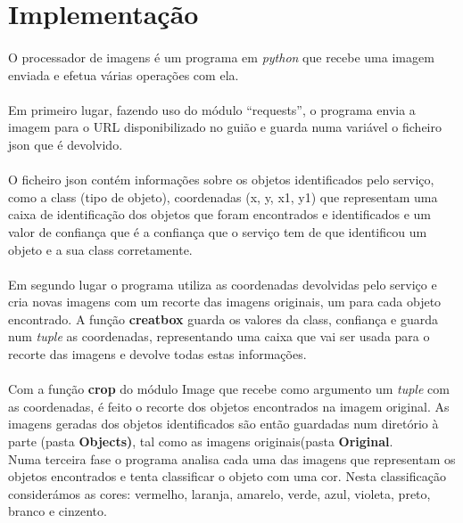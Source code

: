 \documentclass{report}
\begin{document}
\section{Implementação}
\paragraph{}
O processador de imagens é um programa em \textit{python} que recebe uma imagem enviada e
efetua várias operações com ela. 

\paragraph{}

Em primeiro lugar, fazendo uso do módulo “requests”, o programa envia a imagem para o URL
disponibilizado no guião\cite{Object_Detection} e guarda numa variável o ficheiro json que é devolvido. 
\paragraph{}
O ficheiro json contém informações sobre os objetos identificados pelo serviço, como a
class (tipo de objeto), coordenadas (x, y, x1, y1) que representam uma caixa de identificação dos objetos
que foram encontrados e identificados e um valor de confiança que é a confiança que o serviço
tem de que identificou um objeto e a sua class corretamente. 
\paragraph{}
Em segundo lugar o programa utiliza as coordenadas devolvidas pelo serviço e cria novas
imagens com um recorte das imagens originais, um para cada objeto encontrado. A função
\textbf{creatbox} guarda os valores da class, confiança e guarda num \textit{tuple} as coordenadas,
representando uma caixa que vai ser usada para o recorte das imagens e devolve todas estas
informações. 
\paragraph{}
Com a função \textbf{crop} do módulo Image que recebe como argumento um \textit{tuple} com as coordenadas,
é feito o recorte dos objetos encontrados na imagem original. As imagens geradas dos objetos
identificados são então guardadas num diretório à parte (pasta \textbf{Objects)}, tal como as imagens originais(pasta \textbf{Original}.
\\
Numa terceira fase o programa analisa cada uma das imagens que representam os objetos
encontrados e tenta classificar o objeto com uma cor. Nesta classificação considerámos as
cores: vermelho, laranja, amarelo, verde, azul, violeta, preto, branco e cinzento. \linebreak
\end{document}
